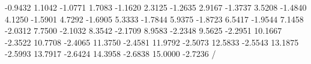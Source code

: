    -0.9432
    1.1042   -1.0771
    1.7083   -1.1620
    2.3125   -1.2635
    2.9167   -1.3737
    3.5208   -1.4840
    4.1250   -1.5901
    4.7292   -1.6905
    5.3333   -1.7844
    5.9375   -1.8723
    6.5417   -1.9544
    7.1458   -2.0312
    7.7500   -2.1032
    8.3542   -2.1709
    8.9583   -2.2348
    9.5625   -2.2951
   10.1667   -2.3522
   10.7708   -2.4065
   11.3750   -2.4581
   11.9792   -2.5073
   12.5833   -2.5543
   13.1875   -2.5993
   13.7917   -2.6424
   14.3958   -2.6838
   15.0000   -2.7236
/\relax
